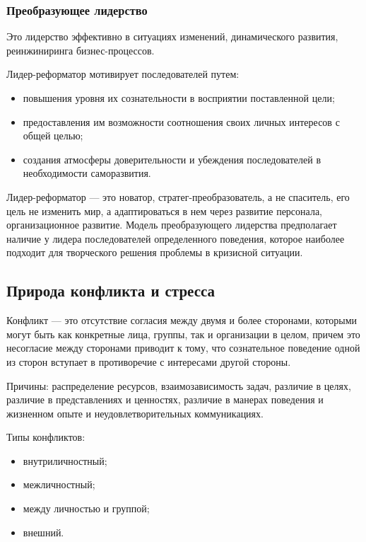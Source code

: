 \documentclass[a4paper,12pt,oneside,final]{extarticle}
\numberwithin{equation}{section}
\begin{document}
\begin{enumerate}
\subsubsection{Преобразующее лидерство} 
Это лидерство эффективно в ситуациях изменений, динамического развития, реинжиниринга бизнес-процессов. 

Лидер-реформатор мотивирует последователей путем:
\begin{itemize}
	\item повышения уровня их сознательности в восприятии поставленной цели;
	\item предоставления им возможности соотношения своих личных интересов с общей целью;
	\item создания атмосферы доверительности и убеждения последователей в необходимости саморазвития. 
\end{itemize}

Лидер-реформатор --- это новатор, стратег-преобразователь, а не спаситель, его цель не изменить мир, а адаптироваться в нем через развитие персонала, организационное развитие. 
Модель преобразующего лидерства предполагает наличие у лидера последователей определенного поведения, которое наиболее подходит для творческого решения проблемы в кризисной ситуации.

\subsection{Природа конфликта и стресса}
Конфликт --- это отсутствие согласия между двумя и более сторонами, которыми могут быть как конкретные лица, группы, так и организации в целом, причем это несогласие между сторонами приводит к тому, что сознательное поведение одной из сторон вступает в противоречие с интересами другой стороны.

Причины: распределение ресурсов, взаимозависимость задач, различие в целях, различие в представлениях и ценностях, различие в манерах поведения и жизненном опыте и неудовлетворительных коммуникациях.

Типы конфликтов:
\begin{itemize}
	\item внутриличностный;
	\item межличностный;
	\item между личностью и группой;
	\item внешний.
\end{itemize}


\end{enumerate}
\end{document}
